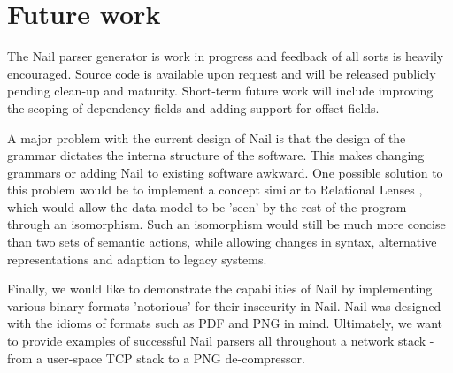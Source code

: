 \section{Future work}

The Nail parser generator is work in progress and feedback of all sorts is heavily
encouraged. Source code is available upon request and will be released publicly pending clean-up and
maturity. Short-term future work will include improving the scoping of dependency fields and adding
support for offset fields.

A major problem with the current design of Nail is that the design of the grammar dictates the
interna structure of the software. This makes changing grammars or adding Nail to existing software
awkward. One possible solution to this problem would be to implement a concept similar to Relational
Lenses \cite{bohannon2006relational}, which would allow  the data model to be 'seen' by
the rest of the program through an isomorphism. Such an isomorphism would still be much more concise
than two sets of semantic actions, while allowing changes in syntax, alternative representations
and adaption to legacy systems.

Finally, we would like to demonstrate the capabilities of Nail by implementing various binary
formats 'notorious' for their insecurity in Nail. Nail was designed with the idioms of formats such
as PDF and PNG in mind. Ultimately, we want to provide examples of successful Nail parsers all
throughout a network stack - from a user-space TCP stack to a PNG de-compressor.

